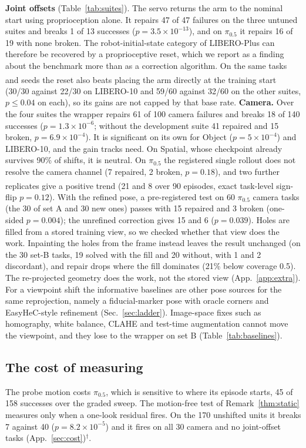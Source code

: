 \documentclass{article}
\newcommand{\pihalf}{$\pi_{0.5}$}
\newcommand{\ph}{\textsuperscript{\dag}}
\begin{document}
\textbf{Joint offsets} (Table~\ref{tab:suites}). The servo returns the arm to the nominal start using proprioception
alone. It repairs 47 of 47 failures on the three untuned suites and breaks 1 of 13 successes ($p = 3.5\times10^{-13}$),
and on \pihalf{} it repairs 16 of 19 with none broken. The robot-initial-state category of LIBERO-Plus can therefore be
recovered by a proprioceptive reset, which we report as a finding about the benchmark more than as a correction
algorithm. On the same tasks and seeds\ph{} the reset also beats placing the arm directly at the training start (30/30
against 22/30 on LIBERO-10 and 59/60 against 32/60 on the other suites, $p \le 0.04$ on each), so its gains are not
capped by that base rate.
\textbf{Camera.} Over the four suites the wrapper repairs 61 of 100 camera failures and breaks 18 of 140 successes
($p = 1.3\times10^{-6}$; without the development suite 41 repaired and 15 broken, $p = 6.9\times10^{-4}$). It is
significant on its own for Object ($p=5\times10^{-4}$) and LIBERO-10, and the gain tracks need. On Spatial, whose
checkpoint already survives 90\% of shifts, it is neutral. On \pihalf{} the registered single rollout does not resolve
the camera channel (7 repaired, 2 broken, $p=0.18$), and two further replicates\ph{} give a positive trend (21 and 8 over
90 episodes, exact task-level sign-flip $p = 0.12$). With the refined pose, a pre-registered test on 60 \pihalf{} camera
tasks (the 30 of set A and 30 new ones) passes with 15 repaired and 3 broken (one-sided $p = 0.004$); the unrefined
correction gives 15 and 6 ($p = 0.039$). Holes are filled from a stored training view, so we checked whether that view
does the work. Inpainting the holes from the frame instead leaves the result unchanged (on the 30 set-B tasks, 19
solved with the fill and 20 without, with 1 and 2 discordant), and repair drops where the fill dominates (21\% below
coverage 0.5). The re-projected geometry does the work, not the stored view (App.~\ref{app:extra}). For a viewpoint
shift the informative baselines are other pose sources for the same reprojection, namely a fiducial-marker pose with oracle corners and EasyHeC-style refinement (Sec.~\ref{sec:ladder}). Image-space fixes such as homography, white
balance, CLAHE and test-time augmentation cannot move the viewpoint, and they lose to the wrapper on set B
(Table~\ref{tab:baselines}).

\subsection{The cost of measuring}
The probe motion costs \pihalf{}, which is sensitive to where its episode starts, 45 of 158 successes over the graded
sweep. The motion-free test of Remark~\ref{thm:static} measures only when a one-look residual fires. On the 170
unshifted units it breaks 7 against 40 ($p = 8.2\times10^{-5}$) and it fires on all 30 camera and no joint-offset
tasks (App.~\ref{sec:cost})$^\dagger$.
\end{document}
